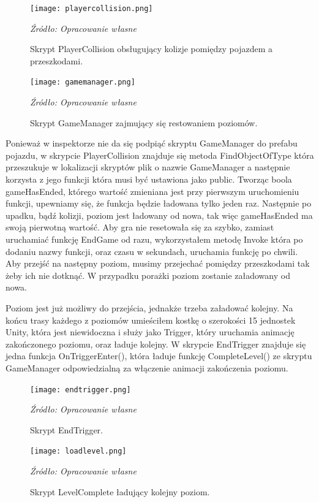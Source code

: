 \begin{figure}[!hbt]
\centering
  \texttt{[image: playercollision.png]}
  \caption{Skrypt PlayerCollision obsługujący kolizje pomiędzy pojazdem a przeszkodami.}\label{rys_7}
  \begin{minipage}[t]{0.75\linewidth}
    \emph{Źródło: Opracowanie własne}
  \end{minipage}
\end{figure}
\begin{figure}[!ht]
\centering
  \texttt{[image: gamemanager.png]}
  \caption{Skrypt GameManager zajmujący się restowaniem poziomów.}\label{rys_8}
  \begin{minipage}[t]{0.75\linewidth}
    \emph{Źródło: Opracowanie własne}
  \end{minipage}
\end{figure}

\indent Ponieważ w inspektorze nie da się podpiąć skryptu GameManager do prefabu pojazdu, w skrypcie PlayerCollision znajduje się metoda FindObjectOfType która przeszukuje w lokalizacji skryptów plik o nazwie GameManager a następnie korzysta z jego funkcji która musi być ustawiona jako public. Tworząc boola gameHasEnded, którego wartość zmieniana jest przy pierwszym uruchomieniu funkcji, upewniamy się, że funkcja będzie ładowana tylko jeden raz. Następnie po upadku, bądź kolizji, poziom jest ładowany od nowa, tak więc gameHasEnded ma swoją pierwotną wartość. Aby gra nie resetowała się za szybko, zamiast uruchamiać funkcję EndGame od razu, wykorzystałem metodę Invoke która po dodaniu nazwy funkcji, oraz czasu w sekundach, uruchamia funkcję po chwili. Aby przejść na następny poziom, musimy przejechać pomiędzy przeszkodami tak żeby ich nie dotknąć. W przypadku porażki poziom zostanie załadowany od nowa.

\indent Poziom jest już możliwy do przejścia, jednakże trzeba załadować kolejny. Na końcu trasy każdego z poziomów umieściłem kostkę o szerokości 15 jednostek Unity, która jest niewidoczna i służy jako Trigger, który uruchamia animację zakończonego poziomu, oraz ładuje kolejny. W skrypcie EndTrigger znajduje się jedna funkcja OnTriggerEnter(), która ładuje funkcję CompleteLevel() ze skryptu GameManager odpowiedzialną za włączenie animacji zakończenia poziomu.

\begin{figure}[!ht]
\centering
  \texttt{[image: endtrigger.png]}
  \caption{Skrypt EndTrigger.}\label{rys_9}
  \begin{minipage}[t]{0.75\linewidth}
    \emph{Źródło: Opracowanie własne}
  \end{minipage}
\end{figure}

\begin{figure}[!ht]
\centering
  \texttt{[image: loadlevel.png]}
  \caption{Skrypt LevelComplete ładujący kolejny poziom.}\label{rys_10}
  \begin{minipage}[t]{0.75\linewidth}
    \emph{Źródło: Opracowanie własne}
  \end{minipage}
\end{figure}

